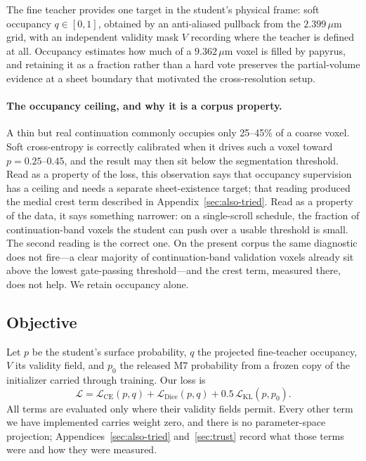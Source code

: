 The fine teacher provides one target in the student's physical frame: soft
occupancy $q\in[0,1]$, obtained by an anti-aliased pullback from the
$2.399\,\mu$m grid, with an independent validity mask $V$ recording where the
teacher is defined at all.
Occupancy estimates how much of a $9.362\,\mu$m voxel is filled by papyrus, and
retaining it as a fraction rather than a hard vote preserves the partial-volume
evidence at a sheet boundary that motivated the cross-resolution setup.

\paragraph{The occupancy ceiling, and why it is a corpus property.}
A thin but real continuation commonly occupies only 25--45\% of a coarse voxel.
Soft cross-entropy is correctly calibrated when it drives such a voxel toward
$p=0.25$--$0.45$, and the result may then sit below the segmentation threshold.
Read as a property of the loss, this observation says that occupancy supervision
has a ceiling and needs a separate sheet-existence target; that reading produced
the medial crest term described in Appendix~\ref{sec:also-tried}.
Read as a property of the data, it says something narrower: on a single-scroll
schedule, the fraction of continuation-band voxels the student can push over a
usable threshold is small.
The second reading is the correct one.
On the present corpus the same diagnostic does not fire---a clear majority of
continuation-band validation voxels already sit above the lowest gate-passing
threshold---and the crest term, measured there, does not help.
We retain occupancy alone.

\subsection{Objective}

Let $p$ be the student's surface probability, $q$ the projected fine-teacher
occupancy, $V$ its validity field, and $p_0$ the released M7 probability from a
frozen copy of the initializer carried through training.
Our loss is
\begin{equation}
\mathcal{L} = \mathcal{L}_{\mathrm{CE}}(p,q)
 + \mathcal{L}_{\mathrm{Dice}}(p,q)
 + 0.5\,\mathcal{L}_{\mathrm{KL}}(p,p_0).
\label{eq:objective}
\end{equation}
All terms are evaluated only where their validity fields permit.
Every other term we have implemented carries weight zero, and there is no
parameter-space projection; Appendices~\ref{sec:also-tried}
and~\ref{sec:trust} record what those terms were and how they were measured.

